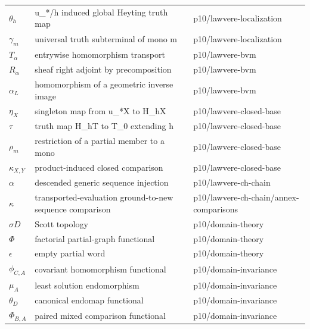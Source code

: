 \begin{longtable}{@{}p{}p{}p{}@{}}
\(\theta_h\) & u\_*/h induced global Heyting truth map & p10/\allowbreak{}lawvere-\allowbreak{}localization \\
\(\gamma_m\) & universal truth subterminal of mono m & p10/\allowbreak{}lawvere-\allowbreak{}localization \\
\(T_\alpha\) & entrywise homomorphism transport & p10/\allowbreak{}lawvere-\allowbreak{}bvm \\
\(R_\alpha\) & sheaf right adjoint by precomposition & p10/\allowbreak{}lawvere-\allowbreak{}bvm \\
\(\alpha_L\) & homomorphism of a geometric inverse image & p10/\allowbreak{}lawvere-\allowbreak{}bvm \\
\(\eta_X\) & singleton map from u\_*X to H\_hX & p10/\allowbreak{}lawvere-\allowbreak{}closed-\allowbreak{}base \\
\(\tau\) & truth map H\_hT to T\_0 extending h & p10/\allowbreak{}lawvere-\allowbreak{}closed-\allowbreak{}base \\
\(\rho_m\) & restriction of a partial member to a mono & p10/\allowbreak{}lawvere-\allowbreak{}closed-\allowbreak{}base \\
\(\kappa_{X,Y}\) & product-induced closed comparison & p10/\allowbreak{}lawvere-\allowbreak{}closed-\allowbreak{}base \\
\(\alpha\) & descended generic sequence injection & p10/\allowbreak{}lawvere-\allowbreak{}ch-\allowbreak{}chain \\
\(\kappa\) & transported-evaluation ground-to-new sequence comparison & p10/\allowbreak{}lawvere-\allowbreak{}ch-\allowbreak{}chain/\allowbreak{}annex-\allowbreak{}comparisons \\
\(\sigma D\) & Scott topology & p10/\allowbreak{}domain-\allowbreak{}theory \\
\(\Phi\) & factorial partial-graph functional & p10/\allowbreak{}domain-\allowbreak{}theory \\
\(\epsilon\) & empty partial word & p10/\allowbreak{}domain-\allowbreak{}theory \\
\(\phi_{C,A}\) & covariant homomorphism functional & p10/\allowbreak{}domain-\allowbreak{}invariance \\
\(\mu_A\) & least solution endomorphism & p10/\allowbreak{}domain-\allowbreak{}invariance \\
\(\theta_D\) & canonical endomap functional & p10/\allowbreak{}domain-\allowbreak{}invariance \\
\(\Phi_{B,A}\) & paired mixed comparison functional & p10/\allowbreak{}domain-\allowbreak{}invariance \\

\end{longtable}
